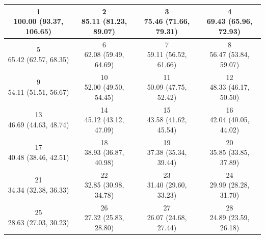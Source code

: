 \begin{table}[htbp]
\centering
\scriptsize
\begin{tabular}{cccc}
\hline
\shortstack[c]{1\\100.00 (93.37, 106.65)} & \shortstack[c]{2\\85.11 (81.23, 89.07)} & \shortstack[c]{3\\75.46 (71.66, 79.31)} & \shortstack[c]{4\\69.43 (65.96, 72.93)} \\
\hline
\shortstack[c]{5\\65.42 (62.57, 68.35)} & \shortstack[c]{6\\62.08 (59.49, 64.69)} & \shortstack[c]{7\\59.11 (56.52, 61.66)} & \shortstack[c]{8\\56.47 (53.84, 59.07)} \\
\hline
\shortstack[c]{9\\54.11 (51.51, 56.67)} & \shortstack[c]{10\\52.00 (49.50, 54.45)} & \shortstack[c]{11\\50.09 (47.75, 52.42)} & \shortstack[c]{12\\48.33 (46.17, 50.50)} \\
\hline
\shortstack[c]{13\\46.69 (44.63, 48.74)} & \shortstack[c]{14\\45.12 (43.12, 47.09)} & \shortstack[c]{15\\43.58 (41.62, 45.54)} & \shortstack[c]{16\\42.04 (40.05, 44.02)} \\
\hline
\shortstack[c]{17\\40.48 (38.46, 42.51)} & \shortstack[c]{18\\38.93 (36.87, 40.98)} & \shortstack[c]{19\\37.38 (35.34, 39.44)} & \shortstack[c]{20\\35.85 (33.85, 37.89)} \\
\hline
\shortstack[c]{21\\34.34 (32.38, 36.33)} & \shortstack[c]{22\\32.85 (30.98, 34.78)} & \shortstack[c]{23\\31.40 (29.60, 33.23)} & \shortstack[c]{24\\29.99 (28.28, 31.70)} \\
\hline
\shortstack[c]{25\\28.63 (27.03, 30.23)} & \shortstack[c]{26\\27.32 (25.83, 28.80)} & \shortstack[c]{27\\26.07 (24.68, 27.44)} & \shortstack[c]{28\\24.89 (23.59, 26.18)} \\

\end{tabular}
\end{table}
